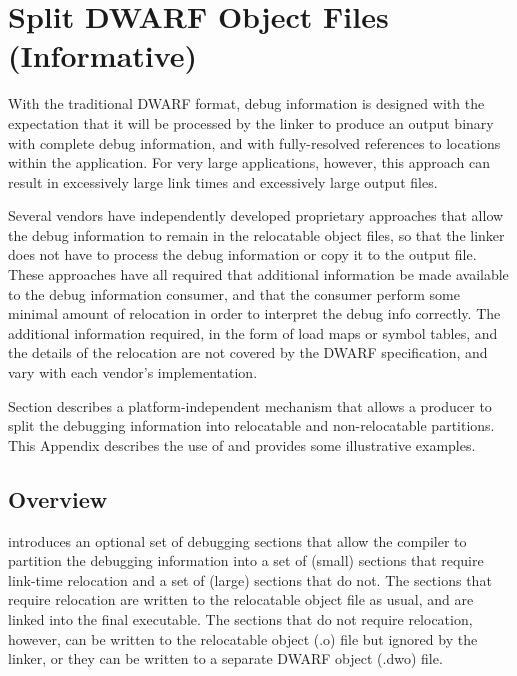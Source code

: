 \chapter[Split DWARF Object Files (Informative)]{Split DWARF Object Files (Informative)}
\label{app:splitdwarfobjectsinformative}
With the traditional DWARF format, debug information is designed
with the expectation that it will be processed by the linker to
produce an output binary with complete debug information, and
with fully-resolved references to locations within the
application. For very large applications, however, this approach
can result in excessively large link times and excessively large
output files. 

Several vendors have independently developed
proprietary approaches that allow the debug information to remain
in the relocatable object files, so that the linker does not have
to process the debug information or copy it to the output file.
These approaches have all required that additional information be
made available to the debug information consumer, and that the
consumer perform some minimal amount of relocation in order to
interpret the debug info correctly. The additional information
required, in the form of load maps or symbol tables, and the
details of the relocation are not covered by the DWARF
specification, and vary with each vendor's implementation.

Section  describes a
platform-independent mechanism that allows a producer to
split the debugging information into relocatable and
non-relocatable partitions. This Appendix describes the use
of  and provides some illustrative
examples.

\section{Overview}
\label{app:splitoverview}
\DWARFVersionV{} introduces an optional set of debugging sections
that allow the compiler to partition the debugging information
into a set of (small) sections that require link-time relocation
and a set of (large) sections that do not. The sections that
require relocation are written to the relocatable object file as
usual, and are linked into the final executable. The sections
that do not require relocation, however, can be written to the
relocatable object (.o) file but ignored by the linker, or they
can be written to a separate DWARF object (.dwo{}) 
 file.

